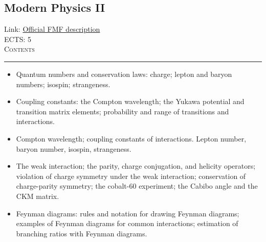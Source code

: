 \documentclass[11pt, a4paper]{article}
\newenvironment{course}[3]{
\subsection{#1}%
Link: \href{#2}{Official FMF description}\\%
ECTS: #3%
\vspace{1ex}
\\
{\large \textsc{Contents}}\\[-0.9ex]%
\rule{\textwidth}{0.5pt}
\vspace{-3ex}
}
{}
\newenvironment{chapter}[1]{
\begin{tcolorbox}[title=#1, breakable]
}
{\end{tcolorbox}}
\begin{document}
\begin{course}{Modern Physics II}{https://www.fmf.uni-lj.si/en/study-physics/programmes/1fiz/2020/7000777/courses/1162/}{5}
\begin{chapter}{Introduction to particle physics}
\begin{itemize}
            \item Quantum numbers and conservation laws: charge; lepton and baryon numbers; isospin; strangeness.
            

            \item Coupling constants: the Compton wavelength; the Yukawa potential and transition matrix elements; probability and range of transitions and interactions.

            \item Compton wavelength; coupling constants of interactions. Lepton number, baryon number, isospin, strangeness. 

            \item The weak interaction; the parity, charge conjugation, and helicity operators; violation of charge symmetry under the weak interaction; conservation of charge-parity symmetry; the cobalt-60 experiment; the Cabibo angle and the CKM matrix.

            \item Feynman diagrams: rules and notation for drawing Feynman diagrams; examples of Feynman diagrams for common interactions; estimation of branching ratios with Feynman diagrams.

        \end{itemize}
    \end{chapter}

\end{course}
\end{document}
